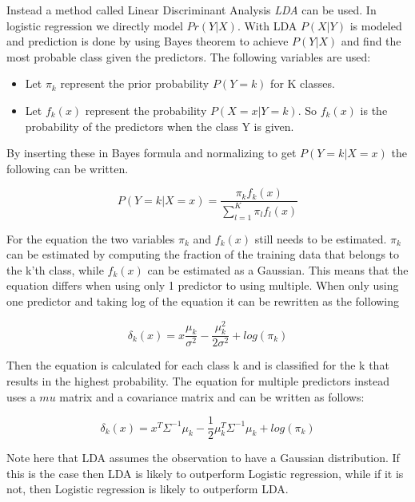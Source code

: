 Instead a method called Linear Discriminant Analysis \emph{LDA} can be used. In logistic regression we directly model $Pr(Y|X)$. With LDA $P(X|Y)$ is modeled and prediction is done by using Bayes theorem to achieve $P(Y|X)$ and find the most probable class given the predictors. The following variables are used:

\begin{itemize}
	\item Let $\pi_k$ represent the prior probability $P(Y=k)$ for K classes.
	\item Let $f_k(x)$ represent the probability $P(X=x|Y=k)$. So $f_k(x)$ is the probability of the predictors when the class Y is given.
\end{itemize} 

By inserting these in Bayes formula and normalizing to get $P(Y=k|X=x)$ the following can be written.

\begin{equation}
P(Y=k|X = x) = \dfrac{\pi_k f_k(x)}{\sum_{l=1}^{K} \pi_l f_l(x)}
\end{equation}

For the equation the two variables $\pi_k$ and $f_k(x)$ still needs to be estimated. $\pi_k$ can be estimated by computing the fraction of the training data that belongs to the k'th class, while $f_k(x)$ can be estimated as a Gaussian. This means that the equation differs when using only 1 predictor to using multiple. When only using one predictor and taking log of the equation it can be rewritten as the following

\begin{equation}
\delta_k(x) = x  \dfrac{\mu_k}{\sigma^2} - \dfrac{\mu_k^2}{2\sigma^2} + log(\pi_k)
\end{equation}

Then the equation is calculated for each class k and is classified for the k that results in the highest probability. The equation for multiple predictors instead uses a $mu$ matrix and a covariance matrix and can be written as follows:

\begin{equation}
\delta_k(x) = x^T \Sigma^{-1} \mu_k -  \frac{1}{2} \mu_k^{T} \Sigma^{-1} \mu_k + log (\pi_k)
\end{equation}

Note here that LDA assumes the observation to have a Gaussian distribution. If this is the case then LDA is likely to outperform Logistic regression, while if it is not, then Logistic regression is likely to outperform LDA. 

